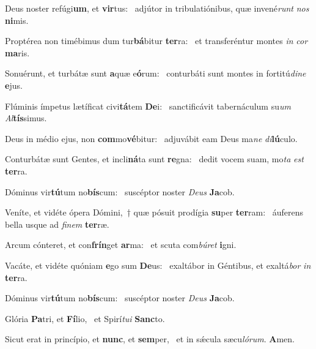 \item Deus noster refúgi\textbf{um}, et \textbf{vir}tus:~\psstar{} adjútor in tribulatiónibus, quæ invené\textit{runt} \textit{nos} \textbf{ni}mis.
\item Proptérea non timébimus dum tur\textbf{bá}bitur \textbf{ter}ra:~\psstar{} et transferéntur montes \textit{in} \textit{cor} \textbf{ma}ris.
\item Sonuérunt, et turbátæ sunt \textbf{a}quæ e\textbf{ó}rum:~\psstar{} conturbáti sunt montes in fortitú\textit{dine} \textbf{e}jus.
\item Flúminis ímpetus lætíficat civi\textbf{tá}tem \textbf{De}i:~\psstar{} sanctificávit tabernáculum su\textit{um} \textit{Al}\textbf{tís}simus.
\item Deus in médio ejus, non \textbf{com}mo\textbf{vé}bitur:~\psstar{} adjuvábit eam Deus ma\textit{ne} \textit{di}\textbf{lú}culo.
\item Conturbátæ sunt Gentes, et incli\textbf{ná}ta sunt \textbf{re}gna:~\psstar{} dedit vocem suam, mo\textit{ta} \textit{est} \textbf{ter}ra.
\item Dóminus vir\textbf{tú}tum no\textbf{bís}\-cum:~\psstar{} suscéptor noster \textit{Deus} \textbf{Ja}cob.
\item Veníte, et vidéte ópera Dómini,~† quæ pósuit prodígia \textbf{su}per \textbf{ter}ram:~\psstar{} áuferens bella usque ad \textit{finem} \textbf{ter}ræ.
\item Arcum cónteret, et con\textbf{frín}get \textbf{ar}ma:~\psstar{} et scuta com\textit{búret} \textbf{i}gni.
\item Vacáte, et vidéte quóniam \textbf{e}go sum \textbf{De}us:~\psstar{} exaltábor in Géntibus, et exaltá\textit{bor} \textit{in} \textbf{ter}ra.
\item Dóminus vir\textbf{tú}tum no\textbf{bís}\-cum:~\psstar{} suscéptor noster \textit{Deus} \textbf{Ja}cob.
\item Glória \textbf{Pa}tri, et \textbf{Fí}lio,~\psstar{} et Spirí\textit{tui} \textbf{Sanc}to.
\item Sicut erat in princípio, et \textbf{nunc}, et \textbf{sem}per,~\psstar{} et in sǽcula sæcu\textit{lórum}. \textbf{A}men.
